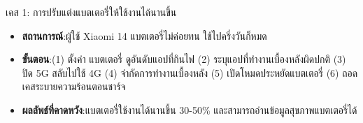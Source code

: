 \begin{tcbinfo}{เคส 1: การปรับแต่งแบตเตอรี่ให้ใช้งานได้นานขึ้น}
\begin{itemize}
  \item \textbf{สถานการณ์}:ผู้ใช้ Xiaomi 14 แบตเตอรี่ไม่ค่อยทน ใช้ไปครึ่งวันก็หมด
  \item \textbf{ขั้นตอน}:(1) ตั้งค่า แบตเตอรี่ ดูอันดับแอปที่กินไฟ (2) ระบุแอปที่ทำงานเบื้องหลังผิดปกติ (3) ปิด 5G สลับไปใช้ 4G (4) จำกัดการทำงานเบื้องหลัง (5) เปิดโหมดประหยัดแบตเตอรี่ (6) ถอดเคสระบายความร้อนตอนชาร์จ
  \item \textbf{ผลลัพธ์ที่คาดหวัง}:แบตเตอรี่ใช้งานได้นานขึ้น 30-50\% และสามารถอ่านข้อมูลสุขภาพแบตเตอรี่ได้
\end{itemize}

\end{tcbinfo}
